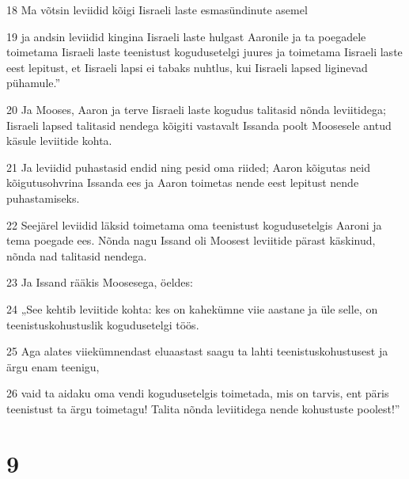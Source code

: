 \par 18 Ma võtsin leviidid kõigi Iisraeli laste esmasündinute asemel
\par 19 ja andsin leviidid kingina Iisraeli laste hulgast Aaronile ja ta poegadele toimetama Iisraeli laste teenistust kogudusetelgi juures ja toimetama Iisraeli laste eest lepitust, et Iisraeli lapsi ei tabaks nuhtlus, kui Iisraeli lapsed liginevad pühamule.”
\par 20 Ja Mooses, Aaron ja terve Iisraeli laste kogudus talitasid nõnda leviitidega; Iisraeli lapsed talitasid nendega kõigiti vastavalt Issanda poolt Moosesele antud käsule leviitide kohta.
\par 21 Ja leviidid puhastasid endid ning pesid oma riided; Aaron kõigutas neid kõigutusohvrina Issanda ees ja Aaron toimetas nende eest lepitust nende puhastamiseks.
\par 22 Seejärel leviidid läksid toimetama oma teenistust kogudusetelgis Aaroni ja tema poegade ees. Nõnda nagu Issand oli Moosest leviitide pärast käskinud, nõnda nad talitasid nendega.
\par 23 Ja Issand rääkis Moosesega, öeldes:
\par 24 „See kehtib leviitide kohta: kes on kahekümne viie aastane ja üle selle, on teenistuskohustuslik kogudusetelgi töös.
\par 25 Aga alates viiekümnendast eluaastast saagu ta lahti teenistuskohustusest ja ärgu enam teenigu,
\par 26 vaid ta aidaku oma vendi kogudusetelgis toimetada, mis on tarvis, ent päris teenistust ta ärgu toimetagu! Talita nõnda leviitidega nende kohustuste poolest!”

\chapter{9}


